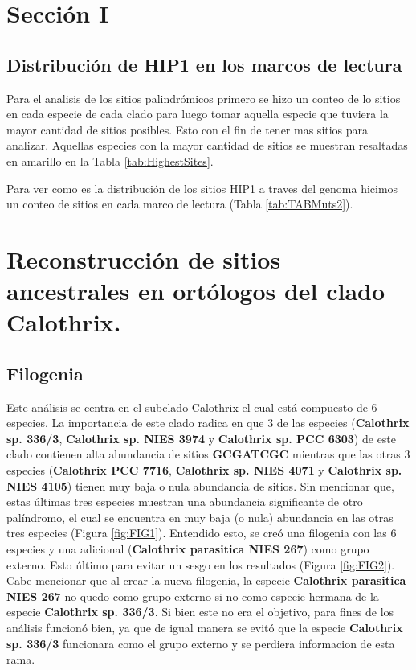 \documentclass[
]{book}
\begin{document}
\hypertarget{secciuxf3n-i}{%
\chapter*{Sección I}\label{secciuxf3n-i}}

\hypertarget{distribuciuxf3n-de-hip1-en-los-marcos-de-lectura}{%
\section{Distribución de HIP1 en los marcos de lectura}\label{distribuciuxf3n-de-hip1-en-los-marcos-de-lectura}}

Para el analisis de los sitios palindrómicos primero se hizo un conteo de lo sitios en cada especie de cada clado para luego tomar aquella especie que tuviera la mayor cantidad de sitios posibles. Esto con el fin de tener mas sitios para analizar. Aquellas especies con la mayor cantidad de sitios se muestran resaltadas en amarillo en la Tabla \ref{tab:HighestSites}.

Para ver como es la distribución de los sitios HIP1 a traves del genoma hicimos un conteo de sitios en cada marco de lectura (Tabla \ref{tab:TABMuts2}).

\hypertarget{reconstrucciuxf3n-de-sitios-ancestrales-en-ortuxf3logos-del-clado-calothrix.}{%
\chapter{Reconstrucción de sitios ancestrales en ortólogos del clado Calothrix.}\label{reconstrucciuxf3n-de-sitios-ancestrales-en-ortuxf3logos-del-clado-calothrix.}}

\hypertarget{filogenia-1}{%
\section{Filogenia}\label{filogenia-1}}

Este análisis se centra en el subclado Calothrix el cual está compuesto de 6 especies. La importancia de este clado radica en que 3 de las especies (\textbf{Calothrix sp. 336/3}, \textbf{Calothrix sp. NIES 3974} y \textbf{Calothrix sp. PCC 6303}) de este clado contienen alta abundancia de sitios \textbf{GCGATCGC} mientras que las otras 3 especies (\textbf{Calothrix PCC 7716}, \textbf{Calothrix sp. NIES 4071} y \textbf{Calothrix sp. NIES 4105}) tienen muy baja o nula abundancia de sitios. Sin mencionar que, estas últimas tres especies muestran una abundancia significante de otro palíndromo, el cual se encuentra en muy baja (o nula) abundancia en las otras tres especies (Figura \ref{fig:FIG1}). Entendido esto, se creó una filogenia con las 6 especies y una adicional (\textbf{Calothrix parasitica NIES 267}) como grupo externo. Esto último para evitar un sesgo en los resultados (Figura \ref{fig:FIG2}). Cabe mencionar que al crear la nueva filogenia, la especie \textbf{Calothrix parasitica NIES 267} no quedo como grupo externo si no como especie hermana de la especie \textbf{Calothrix sp. 336/3}. Si bien este no era el objetivo, para fines de los análisis funcionó bien, ya que de igual manera se evitó que la especie \textbf{Calothrix sp. 336/3} funcionara como el grupo externo y se perdiera informacion de esta rama.
\end{document}
